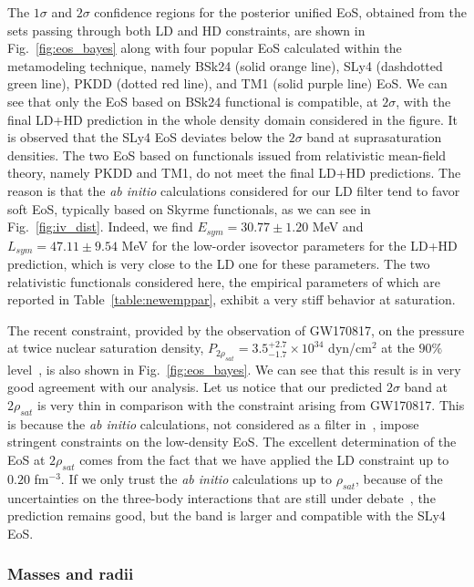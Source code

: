The $1\sigma$ and $2\sigma$ confidence regions for the posterior unified EoS,
obtained from the sets passing through both LD and HD constraints, are shown in
Fig.~\ref{fig:eos_bayes} along with four popular EoS calculated within the
metamodeling technique, namely BSk24 (solid orange line), SLy4 (dashdotted
green line), PKDD (dotted red line), and TM1 (solid purple line) EoS. 
We can see that only the EoS based on BSk24 functional is
compatible, at $2\sigma$, with the final LD+HD prediction in the whole density 
domain considered in the figure. It is observed that the SLy4 EoS deviates
below the $2\sigma$ band at suprasaturation densities.
The two EoS based on functionals issued from relativistic mean-field theory, 
namely PKDD and TM1, do not meet the final LD+HD predictions. The reason is 
that the \textit{ab initio} calculations considered for our LD filter 
\cite{Drischler2016} tend to favor soft EoS, typically based on Skyrme
functionals, as we can see in Fig.~\ref{fig:iv_dist}. Indeed, we find $E_{sym}
= 30.77 \pm 1.20$ MeV and $L_{sym} = 47.11 \pm 9.54$ MeV for the low-order
isovector parameters for the LD+HD prediction, which is very close to the LD
one for these parameters. The two relativistic functionals considered
here, the empirical parameters of which are reported in
Table~\ref{table:newemppar}, exhibit a very stiff behavior at saturation.
 
The recent constraint, provided by the observation of GW170817, on 
the pressure at twice nuclear saturation density, $P_{2\rho_{sat}} =
3.5_{-1.7}^{+2.7}\times 10^{34}$ dyn/cm$^2$ at the $90\%$ level~\cite{GW1}, is 
also shown in Fig.~\ref{fig:eos_bayes}. We can see that this result is in very 
good agreement with our analysis. Let us notice that our predicted $2\sigma$ 
band at $2\rho_{sat}$ is very thin in comparison with the constraint 
arising from GW170817. This is because the \textit{ab initio} calculations, not 
considered as a filter in~\cite{GW1}, impose stringent constraints on the 
low-density EoS.
%
{The excellent determination of the EoS at $2\rho_{sat}$ comes from the 
   fact that we have applied the LD constraint up to $0.20$ fm$^{-3}$. If we 
   only trust the \textit{ab initio} calculations up to $\rho_{sat}$, because 
   of the uncertainties on the three-body interactions that are still under
debate~\cite{Tews2019}, the prediction remains good, but the band is larger and 
compatible with the SLy4 EoS.}

\subsubsection{Masses and radii} %

